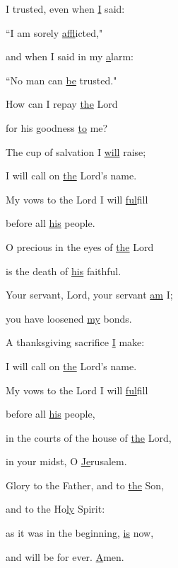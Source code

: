 \noindent I trusted, even when \uline{I} said:~\GreStar{}~\nopagebreak

``I am sorely \uline{af}flicted,"

\noindent and when I said in my \uline{a}larm:~\GreStar{}~\nopagebreak

``No man can \uline{be} trusted."

\noindent How can I repay \uline{the} Lord~\GreStar{}~\nopagebreak

for his goodness \uline{to} me?

\noindent The cup of salvation I \uline{will} raise;~\GreStar{}~\nopagebreak

I will call on \uline{the} Lord’s name.

\noindent My vows to the Lord I will \uline{ful}fill~\GreStar{}~\nopagebreak

before all \uline{his} people.

\noindent O precious in the eyes of \uline{the} Lord~\GreStar{}~\nopagebreak

is the death of \uline{his} faithful.

\noindent Your servant, Lord, your servant \uline{am} I;~\GreStar{}~\nopagebreak

you have loosened \uline{my} bonds.

\noindent A thanksgiving sacrifice \uline{I} make:~\GreStar{}~\nopagebreak

I will call on \uline{the} Lord’s name.

\noindent My vows to the Lord I will \uline{ful}fill~\GreStar{}~\nopagebreak

before all \uline{his} people,

\noindent in the courts of the house of \uline{the} Lord,~\GreStar{}~\nopagebreak

in your midst, O \uline{Je}rusalem.

\noindent Glory to the Father, and to \uline{the} Son,~\GreStar{}~\nopagebreak

and to the Ho\uline{ly} Spirit:

\noindent as it was in the beginning, \uline{is} now,~\GreStar{}~\nopagebreak

and will be for ever. \uline{A}men.
